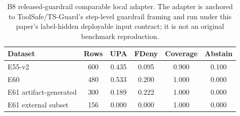 \begin{table}[t]
\centering
\small
\caption{B8 released-guardrail comparable local adapter. The adapter is anchored to ToolSafe/TS-Guard's step-level guardrail framing and run under this paper's label-hidden deployable input contract; it is not an original benchmark reproduction.}
\label{tab:b8-released-adapter}
\begin{tabular}{lccccc}
\toprule
Dataset & Rows & UPA & FDeny & Coverage & Abstain \\
\midrule
E55-v2 & 600 & 0.435 & 0.095 & 0.900 & 0.100 \\
E60 & 480 & 0.533 & 0.200 & 1.000 & 0.000 \\
E61 artifact-generated & 300 & 0.189 & 0.222 & 1.000 & 0.000 \\
E61 external subset & 156 & 0.000 & 0.000 & 1.000 & 0.000 \\
\bottomrule
\end{tabular}
\end{table}
